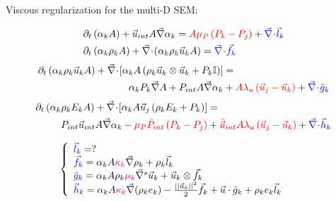 \documentclass[xcolor=dvipsnames,10pt]{beamer}
\renewcommand{\div}{\vec{\nabla}\! \cdot \!}
\newcommand{\grad}{\vec{\nabla}}
\begin{document}
\begin{frame}{Viscous regularization for the multi-D SEM:}
\begin{block}{}
\begin{align}
&\partial_t \left( \alpha_k  A\right) + \vec{u}_{int} A \grad \alpha_k = {\color{red}A \mu_P \left( P_k - P_j \right)} + {\color{blue}\div \vec{l}_k} \nonumber \\
\vspace{6pt}
&\partial_t \left( \alpha_k \rho_k A \right) + \div \left( \alpha_k \rho_k \vec{u}_k A \right) = {\color{blue}\div \vec{f}_k} \nonumber
\end{align}
\begin{align}
\partial_t \left( \alpha_k \rho_k \vec{u}_k A \right) + \div \left[ \alpha_k A \left( \rho_k \vec{u}_k\otimes \vec{u}_k + P_k\mathbb{I}\right) \right] &=  \nonumber \\
\alpha_k P_k \grad A +  P_{int} A \grad \alpha_k &+  {\color{red}A \lambda_u \left( \vec{u}_j - \vec{u}_k \right)} +{\color{blue}\div \bar{g}_k}\nonumber
\end{align}
\begin{align}
\partial_t \left( \alpha_k \rho_k E_k A \right) + \div \left[ \alpha_k A \vec{u}_j \left( \rho_k E_k + P_k \right) \right] &= \nonumber \\
P_{int} \vec{u}_{int} A \grad \alpha_k - {\color{red}\mu_P \bar{P}_{int} \left( P_k-P_j \right)} &+{\color{red}\bar{\vec{u}}_{int} A \lambda_u \left( \vec{u}_j - \vec{u}_k \right)} + {\color{blue}\div \vec{h}_k} \nonumber
\end{align}
\end{block}
\begin{block}{}
\begin{equation}
\left\{
\begin{array}{lcl}
{\color{blue}\vec{l}_k} = ? \\ %
{\color{blue}\vec{f}_k} = \alpha_k A {\color{magenta}\kappa_k}  \grad \rho_k + \rho_k \vec{l}_k& & \\
{\color{blue}\bar{g}_k} = \alpha_k A \rho_k {\color{magenta}\mu_k} \grad^s \vec{u}_k + \vec{u}_k \otimes \vec{f}_k & & \\
{\color{blue}\vec{h}_k} = \alpha_k A {\color{magenta}\kappa_k} \grad(\rho_k e_k) - \frac{||\vec{u}_k||^2}{2} \vec{f}_k + \vec{u} \cdot \bar{g}_k + \rho_k e_k \vec{l}_k & &
\end{array}
\right.
\nonumber
\end{equation}
\end{block}
\end{frame}
\end{document}
